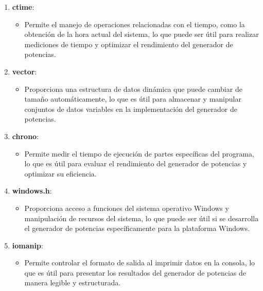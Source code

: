 \documentclass{article}
\begin{document}
\begin{enumerate}
            \item \textbf{ctime}:
            \begin{itemize}
                \item Permite el manejo de operaciones relacionadas con el tiempo, como la obtención de la hora actual del sistema,
                lo que puede ser útil para realizar mediciones de tiempo y optimizar el rendimiento del generador de potencias.
            \end{itemize}

            \item \textbf{vector}:
            \begin{itemize}
                \item Proporciona una estructura de datos dinámica que puede cambiar de tamaño automáticamente, lo que es útil para
                almacenar y manipular conjuntos de datos variables en la implementación del generador de potencias.
            \end{itemize}

            \item \textbf{chrono}:
            \begin{itemize}
                \item Permite medir el tiempo de ejecución de partes específicas del programa, lo que es útil para evaluar
                el rendimiento del generador de potencias y optimizar su eficiencia.
            \end{itemize}

            \item \textbf{windows.h}:
            \begin{itemize}
                \item Proporciona acceso a funciones del sistema operativo Windows y manipulación de recursos del sistema,
                lo que puede ser útil si se desarrolla el generador de potencias específicamente para la plataforma Windows.
            \end{itemize}

            \item \textbf{iomanip}:
            \begin{itemize}
                \item Permite controlar el formato de salida al imprimir datos en la consola, lo que es útil para presentar los
                resultados del generador de potencias de manera legible y estructurada.
            \end{itemize}


\end{enumerate}
\end{document}

